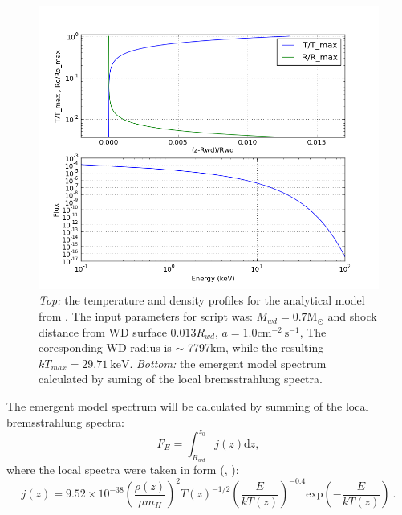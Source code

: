 \documentclass[oneside,a4paper,11pt]{report}
\begin{document}
\begin{figure}[hbt]
\centering
\includegraphics[totalheight=10cm]{model/image}
\caption{\textit{Top:} the temperature and density profiles for the analytical model from \citet{accpower:1}. The input 
parameters for script was: $M_{wd} = 0.7\mathrm{M_\odot}$ and shock distance from WD 
surface $0.013 R_{wd}$, $a = 1.0 \mathrm{cm^{-2}\:s^{-1}}$, The coresponding WD radius is $\sim$ 7797km, while the 
resulting $kT_{max} = 29.71\mathrm{\:keV}$.
\textit{Bottom:} the emergent model spectrum calculated by suming of the local bremsstrahlung spectra.}
\label{koc_mod} 
\end{figure}

The emergent model spectrum will be calculated by summing of the local bremsstrahlung spectra:
\begin{equation}
 \label{int_spec1}
F_E = \int_{R_{wd}}^{z_0}j(z)\mathrm{d}z,
\end{equation}
where the local spectra were taken in form (\citet{zomb}, \citet{2005A&A...435..191S}): 
\begin{equation}
 \label{loc_spec_zom}
j(z) = 9.52\times 10^{-38} \left( \frac{\rho (z)}{\mu m_H}\right)^2 T(z)^{-1/2} \left(\frac{E}{kT(z)} \right)^{-0.4} \mathrm{exp}\left(-\frac{E}{kT(z)} \right) \:.
\end{equation}
\end{document}
